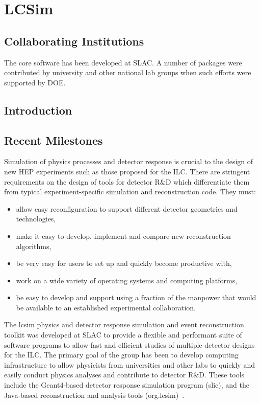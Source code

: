 \section{LCSim}
\subsection{Collaborating Institutions}

The core software has been developed at SLAC. A number of packages were
contributed by university and other national lab groups when such efforts were
supported by DOE.

\subsection{Introduction}
\subsection{Recent Milestones}
Simulation of physics processes and detector response is crucial to the design
of new HEP experiments such as those proposed for the ILC. There are stringent
requirements on the design of tools for detector R\&D which differentiate them
from typical experiment-specific simulation and reconstruction code. They must:
\begin{itemize}
\item allow easy reconfiguration to support different detector geometries and technologies,
\item make it easy to develop, implement and compare new reconstruction algorithms,
\item be very easy for users to set up and quickly become productive with,
\item work on a wide variety of operating systems and computing platforms,
\item be easy to develop and support using a fraction of the manpower that would be available to an established experimental collaboration.
\end{itemize}
The lcsim physics and detector response simulation and event reconstruction
toolkit was developed at SLAC to provide a flexible and performant suite of
software programs to allow fast and efficient studies of multiple detector
designs for the ILC. The primary goal of the group has been to develop computing
infrastructure to allow physicists from universities and other labs to quickly
and easily conduct physics analyses and contribute to detector R\&D. These tools
include the Geant4-based detector response simulation program (slic), and the
Java-based reconstruction and analysis tools (org.lcsim)~\cite{lcsimWebpage}.

